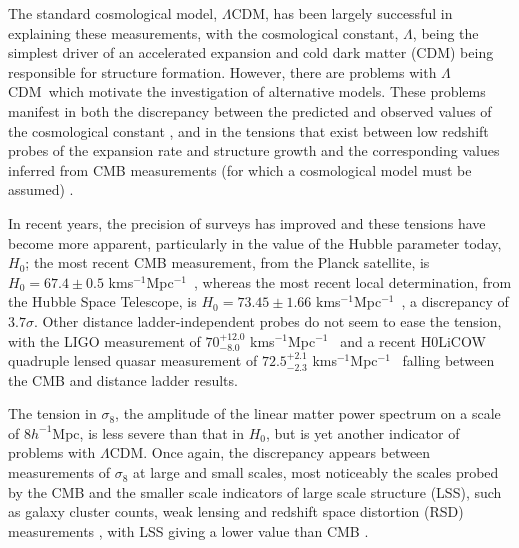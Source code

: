 \documentclass[a4paper,fleqn,usenatbib]{mnras}
\newcommand*{\LCDM}{$\Lambda$CDM}
\newcommand*{\La}{$\Lambda$}
\newcommand*{\kmsMpc}{kms$^{-1}$Mpc$^{-1}$}
\begin{document}
The standard cosmological model, \LCDM, has been largely successful in explaining these measurements, with the cosmological constant, \La, being the simplest driver of an accelerated expansion and cold dark matter (CDM) being responsible for structure formation. However, there are problems with  \LCDM \ which motivate the investigation of alternative models. These problems manifest in both the discrepancy between the predicted and observed values of the cosmological constant \citep{Weinberg1989, Adler1995}, and in the tensions that exist between low redshift probes of the expansion rate and structure growth and the corresponding values inferred from CMB measurements (for which a cosmological model must be assumed) \citep{Macaulay:2013swa, Bernal:2016gxb}.

In recent years, the precision of surveys has improved and these tensions have become more apparent, particularly in the value of the Hubble parameter today, $H_0$; the most recent CMB measurement, from the Planck satellite, is $H_0 = 67.4 \pm 0.5$ \kmsMpc \ \citep{Aghanim:2018eyx}, whereas the most recent local determination, from the Hubble Space Telescope, is $H_0 = 73.45 \pm 1.66$ \kmsMpc \ \citep{Riess2018}, a discrepancy of $3.7 \sigma$. Other distance ladder-independent probes do not seem to ease the tension, with the LIGO measurement of $70^{+12.0}_{-8.0}$ \kmsMpc \ \citep{Abbott:2017xzu} and a recent H0LiCOW quadruple lensed quasar measurement of $72.5^{+2.1}_{-2.3}$ \kmsMpc \ \citep{Birrer2018} falling between the CMB and distance ladder results.

The tension in $\sigma_8$, the amplitude of the linear matter power spectrum on a scale of $8 h^{-1}$Mpc, is less severe than that in $H_0$, but is yet another indicator of problems with \LCDM. Once again, the discrepancy appears between measurements of $\sigma_8$ at large and small scales, most noticeably the scales probed by the CMB and the smaller scale indicators of large scale structure (LSS), such as galaxy cluster counts, weak lensing and redshift space distortion (RSD) measurements \citep{Battye:2014qga}, with LSS giving a lower value than CMB \citep{Abbott:2017wau}.
\end{document}
